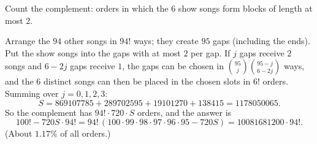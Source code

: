 Count the complement: orders in which the $6$ show songs form blocks of length at most $2$.

Arrange the $94$ other songs in $94!$ ways; they create $95$ gaps (including the ends). Put the show songs into the gaps with at most $2$ per gap. If $j$ gaps receive $2$ songs and $6-2j$ gaps receive $1$, the gaps can be chosen in $\binom{95}{j}\binom{95-j}{6-2j}$ ways, and the $6$ distinct songs can then be placed in the chosen slots in $6!$ orders. Summing over $j=0,1,2,3$:
\[S=869107785+289702595+19101270+138415=1178050065.\]
So the complement has $94!\cdot720\cdot S$ orders, and the answer is
\[100!-720S\cdot94!=94!\,(100\cdot99\cdot98\cdot97\cdot96\cdot95-720S)=\boxed{10081681200\cdot94!}.\]
(About $1.17\%$ of all orders.)
